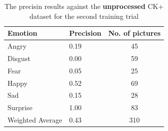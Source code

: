 \documentclass[runningheads,a4paper,11pt]{report}
\begin{document}
\begin{table}[htbp]
	\caption{The precisin results against the \textbf{unprocessed} CK+ dataset for the second training trial}
	\label{fer_training_28k_01_unprocessed_ckp}
		\begin{center}
			\begin{tabular}{p{110pt}p{110pt}c}
				\textbf{Emotion}& \textbf{Precision}& \textbf{No. of pictures} \\
				\hline\hline
				Angry& 0.19& 45 \\
				Disgust& 0.00& 59 \\
				Fear& 0.05& 25 \\
				Happy& 0.52& 69 \\
				Sad& 0.15& 28 \\
				Surprise& 1.00& 83 \\
				\hline
				Weighted Average& 0.43& 310
			\end{tabular}
		\end{center}
\end{table}
\end{document}
